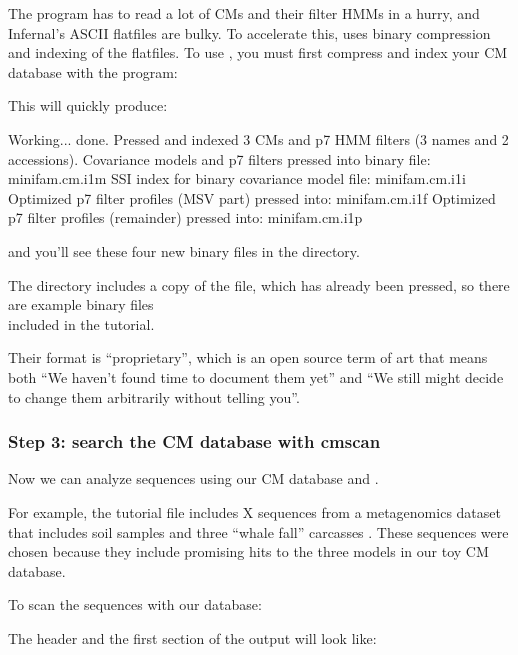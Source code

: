 The  program has to read a lot of CMs and their filter
HMMs in a hurry, and Infernal's ASCII flatfiles are bulky. To
accelerate this,  uses binary compression and indexing of
the flatfiles.  To use , you must first compress and
index your CM database with the  program:


This will quickly produce:

\begin{sreoutput}
Working...    done.
Pressed and indexed 3 CMs and p7 HMM filters (3 names and 2 accessions).
Covariance models and p7 filters pressed into binary file:  minifam.cm.i1m
SSI index for binary covariance model file:                 minifam.cm.i1i
Optimized p7 filter profiles (MSV part)  pressed into:      minifam.cm.i1f
Optimized p7 filter profiles (remainder) pressed into:      minifam.cm.i1p
\end{sreoutput}

and you'll see these four new binary files in the directory. 

The  directory includes a copy of the
 file, which has already been pressed, so there
are example binary files\\
included in the tutorial.

Their format is ``proprietary'', which is an open source term of art
that means both ``We haven't found time to document them yet'' and ``We
still might decide to change them arbitrarily without telling you''.

\subsubsection{Step 3: search the CM database with cmscan}

Now we can analyze sequences using our CM database and
. 

For example, the tutorial file  includes X
sequences from a metagenomics dataset that includes soil samples and three
``whale fall'' carcasses \cite{Tringe05}. These sequences were
chosen because they include promising hits to the three models in
our toy CM database.

To scan the sequences with our database: 


The header and the first section of the output will look like:

